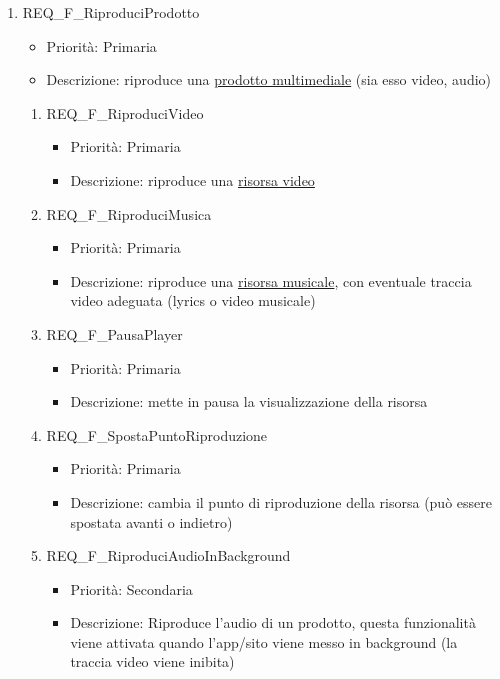 \begin{enumerate}
	\item REQ\_F\_RiproduciProdotto
		\begin{itemize}
		\item Priorità: Primaria	
		\item Descrizione: riproduce una \hyperlink{AnReqProdMult}{prodotto multimediale} (sia esso video, audio)
		\end{itemize}
    		\begin{enumerate}[label*=\arabic*.]      				
		\item REQ\_F\_RiproduciVideo
			\begin{itemize}
			\item Priorità: Primaria
			\item Descrizione: riproduce una \hyperlink{AnReqVideo}{risorsa video}
			\end{itemize}
		\item REQ\_F\_RiproduciMusica
			\begin{itemize}
			\item Priorità: Primaria
			\item Descrizione: riproduce una \hyperlink{AnReqMusicali}{risorsa musicale}, con eventuale traccia video adeguata (lyrics o video musicale)
			\end{itemize}
			
		\item REQ\_F\_PausaPlayer
			\begin{itemize}
			\item Priorità: Primaria
			\item Descrizione: mette in pausa la visualizzazione della risorsa
			\end{itemize}
			
		\item REQ\_F\_SpostaPuntoRiproduzione
			\begin{itemize}
			\item Priorità: Primaria
			\item Descrizione: cambia il punto di riproduzione della risorsa (può essere spostata avanti o indietro)
			\end{itemize}
		\item REQ\_F\_RiproduciAudioInBackground
			\begin{itemize}
			\item Priorità: Secondaria
			\item Descrizione: Riproduce l'audio di un prodotto, questa funzionalità viene attivata quando l'app/sito viene messo in background (la traccia video viene inibita)
			\end{itemize}		
		\end{enumerate}
		

\end{enumerate}
